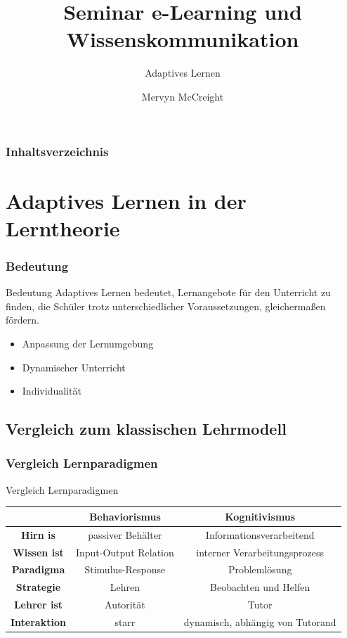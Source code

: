 \documentclass{beamer}
\title[Seminar]{Seminar e-Learning und Wissenskommunikation}
\subtitle[Remailer]{Adaptives Lernen}
\author[M. McCreight]{Mervyn McCreight}
\institute[FH-Wedel]{FH-Wedel}
\begin{document}
  \usetikzlibrary{positioning}
  \usetikzlibrary{shapes}
  \usetikzlibrary{arrows,automata}


\frame{\titlepage}

\begin{frame}
	\frametitle{Inhaltsverzeichnis}
	\tableofcontents
\end{frame}

\section{Adaptives Lernen in der Lerntheorie}
  \begin{frame}
    \frametitle{Bedeutung}
    \begin{block}{Bedeutung}
      Adaptives Lernen bedeutet, Lernangebote für den Unterricht zu finden, die Schüler trotz unterschiedlicher Voraussetzungen, gleichermaßen fördern.
    \end{block}

    \centering
    \begin{itemize}
      \item Anpassung der Lernumgebung
      \item Dynamischer Unterricht
      \item Individualität
    \end{itemize}
  \end{frame}
\subsection{Vergleich zum klassischen Lehrmodell}
  \begin{frame}
   \frametitle{Vergleich Lernparadigmen}
   \begin{block}{Vergleich Lernparadigmen}
      \begin{table}[!htbp]
        \centering
        \begin{tabular}{c || c | c}
          \hline
          \  & \textbf{Behaviorismus} & \textbf{Kognitivismus} \\
          \hline
          \textbf{Hirn is} & passiver Behälter & Informationsverarbeitend \\
          \textbf{Wissen ist} & Input-Output Relation & interner Verarbeitungsprozess \\
          \textbf{Paradigma} & Stimulus-Response & Problemlösung  \\
          \textbf{Strategie} & Lehren & Beobachten und Helfen \\
          \textbf{Lehrer ist} & Autorität & Tutor \\
          \textbf{Interaktion} & starr & dynamisch, abhängig von Tutorand \\
        \end{tabular}
      \end{table}
   \end{block}
  \end{frame}
\end{document}
